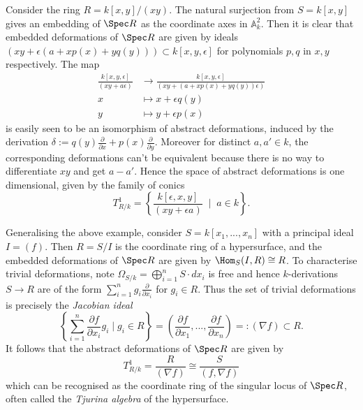 \begin{example}
    Consider the ring \(R=k[x,y]/(xy)\). The natural surjection from \(S =
    k[x,y]\) gives an embedding of \(\Spec R\) as the coordinate axes in
    \(\mathbb{A}^2_k\). Then it is clear that embedded deformations of \(\Spec
    R\) are given by ideals \((xy+\epsilon(a+xp(x)+yq(y)))\subset
    k[x,y,\epsilon]\) for polynomials \(p,q\) in \(x,y\) respectively. The map 
    \begin{align*}
        \frac{k[x,y,\epsilon]}{(xy+a\epsilon)}&\rightarrow
        \frac{k[x,y,\epsilon]}{(xy+(a+xp(x)+yq(y))\epsilon)} \\ 
        x &\mapsto x+\epsilon q(y) \\ 
        y &\mapsto y+\epsilon p(x)
    \end{align*}
    is easily seen to be an isomorphism of abstract deformations, induced by the
    derivation \(\delta:=q(y)\frac{\partial}{\partial
    x}+p(x)\frac{\partial}{\partial y}\). Moreover for distinct $a,a'\in k$, the
    corresponding deformations can't be equivalent because there is no way to
    differentiate $xy$ and get $a-a'$. Hence the space of abstract deformations
    is one dimensional, given by the family of conics 
    \[ T^1_{R/k} = \left\{\frac{k[\epsilon,x,y]}{(xy+\epsilon a)} \;\mid \; a\in
    k \right\}.\] 
\end{example}

\begin{example}
    Generalising the above example, consider \(S=k[x_1,...,x_n]\) with a
    principal ideal \(I=(f)\). Then \(R=S/I\) is the coordinate ring of a
    hypersurface, and the embedded deformations of \(\Spec R\) are given by
    \(\Hom_S(I,R)\cong R\). To characterise trivial deformations, note
    \(\Omega_{S/k} =\bigoplus_{i=1}^n S\cdot dx_i\) is free and hence
    \(k\)-derivations \(S\rightarrow R\) are of the form \(\sum_{i=1}^n g_i
    \frac{\partial}{\partial x_i}\) for \(g_i\in R\). Thus the set of trivial
    deformations is precisely the \textit{Jacobian ideal}
    \[
        \left\{\sum_{i=1}^n \frac{\partial f}{\partial x_i}g_i \;|\; g_i \in R
        \right\} =
        \left(\frac{\partial f}{\partial x_1},..., \frac{\partial f}{\partial
        x_n}\right) =: (\nabla f)\subset R.
    \]
    It follows that the abstract deformations of \(\Spec R\) are given by 
    \[T^1_{R/k}=\frac{R}{(\nabla f)} \cong \frac{S}{(f,\nabla f)} \]
    which can be recognised as the coordinate ring of the singular locus of
    \(\Spec R\), often called the \textit{Tjurina algebra} of the hypersurface. 

    \end{example}

